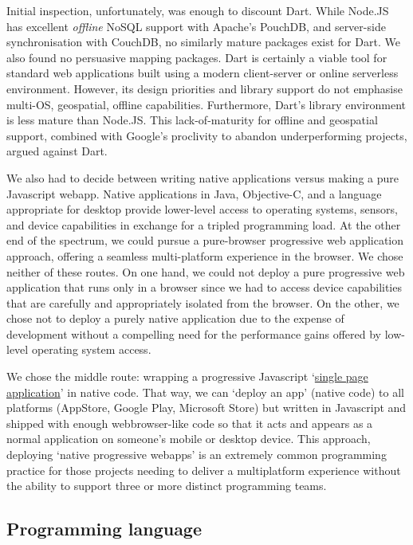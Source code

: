 \documentclass{faims3_report}
\begin{document}
Initial inspection, unfortunately, was enough to discount Dart. While
Node.JS has excellent \emph{offline} NoSQL support with Apache's
PouchDB, and server-side synchronisation with CouchDB, no similarly
mature packages exist for Dart. We also found no persuasive mapping
packages. Dart is certainly a viable tool for standard web applications
built using a modern client-server or online serverless environment.
However, its design priorities and library support do not emphasise
multi-OS, geospatial, offline capabilities. Furthermore, Dart's library
environment is less mature than Node.JS. This lack-of-maturity for
offline and geospatial support, combined with Google's proclivity to
abandon underperforming projects, argued against Dart.

We also had to decide between writing native applications versus making
a pure Javascript webapp. Native applications in Java, Objective-C, and
a language appropriate for desktop provide lower-level access to
operating systems, sensors, and device capabilities in exchange for a
tripled programming load. At the other end of the spectrum, we could
pursue a pure-browser progressive web application approach, offering a
seamless multi-platform experience in the browser. We chose neither of
these routes. On one hand, we could not deploy a pure progressive web
application that runs only in a browser since we had to access device
capabilities that are carefully and appropriately isolated from the
browser. On the other, we chose not to deploy a purely native
application due to the expense of development without a compelling need
for the performance gains offered by low-level operating system access.

We chose the middle route: wrapping a progressive Javascript
`\href{https://en.wikipedia.org/wiki/Single-page_application}{{single
page application}}' in native code. That way, we can `deploy an app'
(native code) to all platforms (AppStore, Google Play, Microsoft Store)
but written in Javascript and shipped with enough webbrowser-like code
so that it acts and appears as a normal application on someone's mobile
or desktop device. This approach, deploying `native progressive webapps'
is an extremely common programming practice for those projects needing
to deliver a multiplatform experience without the ability to support
three or more distinct programming teams.

\subsection{Programming language}
\end{document}
